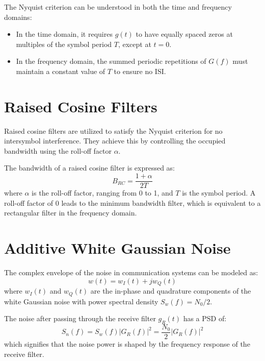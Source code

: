 The Nyquist criterion can be understood in both the time and frequency domains:
\begin{itemize}
    \item In the time domain, it requires \( g(t) \) to have equally spaced zeros at multiples of the symbol period \( T \), except at \( t = 0 \).
    \item In the frequency domain, the summed periodic repetitions of \( G(f) \) must maintain a constant value of \( T \) to ensure no ISI.
\end{itemize}


\section*{Raised Cosine Filters}

Raised cosine filters are utilized to satisfy the Nyquist criterion for no intersymbol interference. They achieve this by controlling the occupied bandwidth using the roll-off factor \( \alpha \).

The bandwidth of a raised cosine filter is expressed as:
\[ B_{RC} = \frac{1 + \alpha}{2T} \]
where \( \alpha \) is the roll-off factor, ranging from 0 to 1, and \( T \) is the symbol period. A roll-off factor of 0 leads to the minimum bandwidth filter, which is equivalent to a rectangular filter in the frequency domain.

\section*{Additive White Gaussian Noise}

The complex envelope of the noise in communication systems can be modeled as:
\[ w(t) = w_I(t) + j w_Q(t) \]
where \( w_I(t) \) and \( w_Q(t) \) are the in-phase and quadrature components of the white Gaussian noise with power spectral density \( S_w(f) = N_0 / 2 \).

The noise after passing through the receive filter \( g_R(t) \) has a PSD of:
\[ S_{n}(f) = S_{w}(f) |G_R(f)|^2 = \frac{N_0}{2} |G_R(f)|^2 \]
which signifies that the noise power is shaped by the frequency response of the receive filter.


